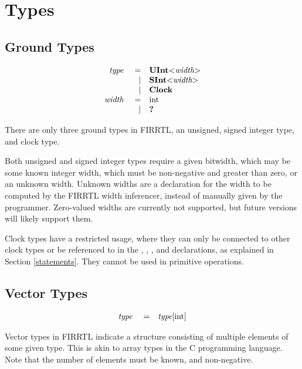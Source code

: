 \documentclass[12pt]{article}
\begin{document}
\section{Types}

\subsection{Ground Types}
\[
\begin{array}{rrl}
\text{\em type\ }       &=     &\text{\bf UInt}\text{\bf $<$} \text{\em width} \text{\bf $>$}      \\
                &\vert &\text{\bf SInt}\text{\bf $<$} \text{\em width} \text{\bf $>$}      \\
                &\vert &\text{\bf Clock} \\
\text{\em width\ }      &=     &\text{int}                       \\
                &\vert &\text{\bf ?\ }                      \\
\end{array}
\]

There are only three ground types in FIRRTL, an unsigned, signed integer type, and clock type.

Both unsigned and signed integer types require a given bitwidth, which may be some known integer width, which must be non-negative and greater than zero, or an unknown width.
Unknown widths are a declaration for the width to be computed by the FIRRTL width inferencer, instead of manually given by the programmer.
Zero-valued widths are currently not supported, but future versions will likely support them.

Clock types have a restricted usage, where they can only be connected to other clock types or be referenced to in the , , , and  declarations, as explained in Section \ref{statements}.
They cannot be used in primitive operations.

\subsection{Vector Types}
\[
\begin{array}{rrl}
\text{\em type\ }       &=     &\text{\em type}[\text{int}]           \\
\end{array}
\]

Vector types in FIRRTL indicate a structure consisting of multiple elements of some given type.
This is akin to array types in the C programming language.
Note that the number of elements must be known, and non-negative.
\end{document}
